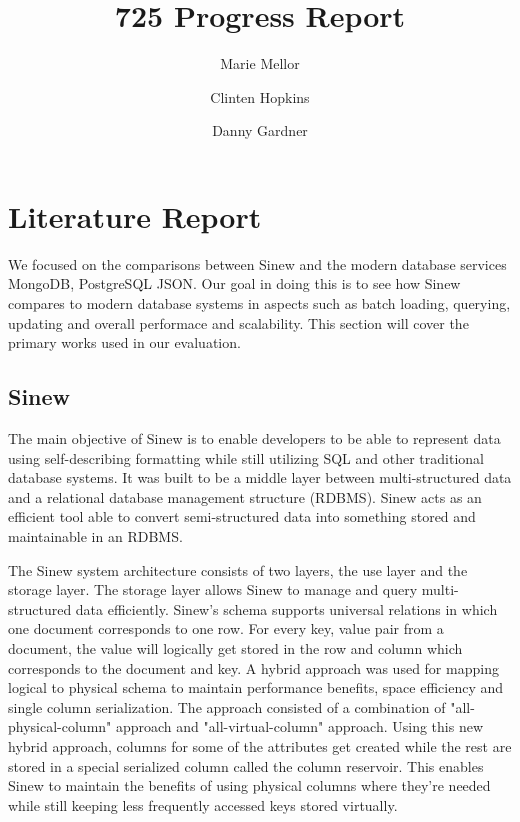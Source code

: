 \documentclass[sigconf]{acmart}
\begin{document}
\title{725 Progress Report}
\author{Marie Mellor \and Clinten Hopkins \and Danny Gardner}

\maketitle


\section{Literature Report}
   We focused on the comparisons between Sinew and the modern database services MongoDB, PostgreSQL JSON. Our goal in doing this is to see how Sinew compares to modern database systems in aspects such as batch loading, querying, updating and overall performace and scalability. This section will cover the primary works used in our evaluation.

   \subsection{Sinew}

   The main objective of Sinew\cite{Tahara_Diamond_Abadi_2014} is to enable developers to be able to represent data using self-describing formatting while still utilizing SQL and other traditional database systems. It was built to be a middle layer between multi-structured data and a relational database management structure (RDBMS). Sinew acts as an efficient tool able to convert semi-structured data into something stored and maintainable in an RDBMS.

   The Sinew system architecture consists of two layers, the use layer and the storage layer. The storage layer allows Sinew to manage and query multi-structured data efficiently. Sinew's schema supports universal relations in which one document corresponds to one row. For every key, value pair from a document, the value will logically get stored in the row and column which corresponds to the document and key. A hybrid approach was used for mapping logical to physical schema to maintain performance benefits, space efficiency and single column serialization. The approach consisted of a combination of "all-physical-column" approach and "all-virtual-column" approach. Using this new hybrid approach, columns for some of the attributes get created while the rest are stored in a special serialized column called the column reservoir. This enables Sinew to maintain the benefits of using physical columns where they're needed while still keeping less frequently accessed keys stored virtually.
\end{document}
